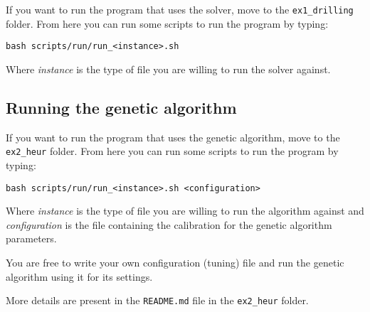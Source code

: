If you want to run the program that uses the \cplex{} solver, move to the
\texttt{ex1\_drilling} folder. From here you can run some scripts to run the
program by typing:

\begin{verbatim}
bash scripts/run/run_<instance>.sh
\end{verbatim}

Where \textit{\<instance\>} is the type of file you are willing to run the
solver against.

\subsection{Running the genetic algorithm}

If you want to run the program that uses the genetic algorithm, move to the
\texttt{ex2\_heur} folder. From here you can run some scripts to run the
program by typing:

\begin{verbatim}
bash scripts/run/run_<instance>.sh <configuration>
\end{verbatim}

Where \textit{\<instance\>} is the type of file you are willing to run the
algorithm against and \textit{\<configuration\>} is the file containing the
calibration for the genetic algorithm parameters.

You are free to write your own configuration (tuning) file and run the genetic
algorithm using it for its settings.

More details are present in the \texttt{README.md} file in the
\texttt{ex2\_heur} folder.

